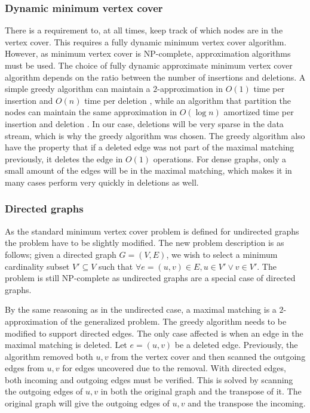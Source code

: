 \subsubsection{Dynamic minimum vertex cover}
There is a requirement to, at all times, keep track of which nodes are in the vertex cover. This requires a fully dynamic minimum vertex cover algorithm. However, as minimum vertex cover is NP-complete, approximation algorithms must be used. The choice of fully dynamic approximate minimum vertex cover algorithm depends on the ratio between the number of insertions and deletions. A simple greedy algorithm can maintain a $2$-approximation in $O(1)$ time per insertion and $O(n)$ time per deletion \cite{2appdynvc}, while an algorithm that partition the nodes can maintain the same approximation in $O(\log n )$ amortized time per insertion and deletion \cite{2appdynvclogn}. In our case, deletions will be very sparse in the data stream, which is why the greedy algorithm was chosen. The greedy algorithm also have the property that if a deleted edge was not part of the maximal matching previously, it deletes the edge in $O(1)$ operations. For dense graphs, only a small amount of the edges will be in the maximal matching, which makes it in many cases perform very quickly in deletions as well. 

 
\subsubsection{Directed graphs}
As the standard minimum vertex cover problem is defined for undirected graphs the problem have to be slightly modified. The new problem description is as follows; given a directed graph $G = (V,E)$, we wish to select a minimum cardinality subset $V' \subseteq V$ such that $\forall e = (u,v) \in E, u \in V' \vee v \in V'$. The problem is still NP-complete as undirected graphs are a special case of directed graphs. 

By the same reasoning as in the undirected case, a maximal matching is a $2$-approximation of the generalized problem. The greedy algorithm needs to be modified to support directed edges. The only case affected is when an edge in the maximal matching is deleted. Let $e = (u,v)$ be a deleted edge. Previously, the algorithm removed both $u,v$ from the vertex cover and then scanned the outgoing edges from $u,v$ for edges uncovered due to the removal. With directed edges, both incoming and outgoing edges must be verified. This is solved by scanning the outgoing edges of $u,v$ in both the original graph and the transpose of it. The original graph will give the outgoing edges of $u,v$ and the transpose the incoming.

